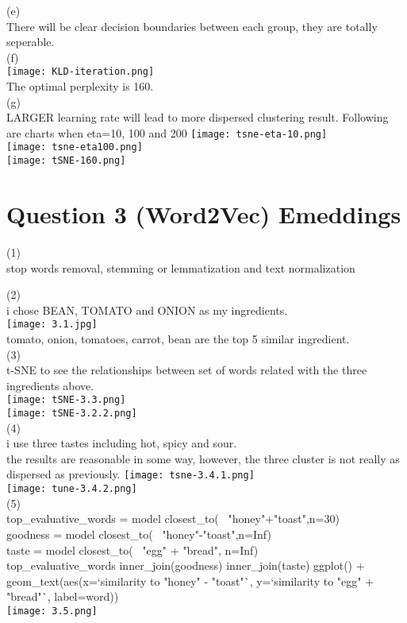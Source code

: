 \documentclass{article}
\begin{document}
(e) \\
There will be clear decision boundaries between each group, they are totally seperable. \\
(f) \\
\texttt{[image: KLD-iteration.png]}\\
The optimal perplexity is 160. \\
(g) \\
LARGER learning rate will lead to more dispersed clustering result.
Following are charts when eta=10, 100 and 200
\texttt{[image: tsne-eta-10.png]}\\
\texttt{[image: tsne-eta100.png]}\\
\texttt{[image: tSNE-160.png]}\\

\section{Question 3 (Word2Vec) Emeddings} 
(1) \\
stop words removal, stemming or lemmatization and text normalization 

(2) \\
i chose BEAN, TOMATO and ONION as my ingredients. \\
\texttt{[image: 3.1.jpg]}\\
tomato, onion, tomatoes, carrot, bean are the top 5 similar ingredient. \\
(3) \\
t-SNE to see the relationships between set of words related with the three ingredients above. \\
\texttt{[image: tSNE-3.3.png]}\\
\texttt{[image: tSNE-3.2.2.png]}\\

(4) \\
i use three tastes including hot, spicy and sour. \\
the results are reasonable in some way, however, the three cluster is not really as dispersed as previously. 
\texttt{[image: tsne-3.4.1.png]}\\
\texttt{[image: tune-3.4.2.png]}\\

(5) \\
top_evaluative_words = model %
  closest_to(~ "honey"+"toast",n=30) \\
goodness = model %
  closest_to(~ "honey"-"toast",n=Inf) \\
taste = model %
  closest_to(~ "egg" + "bread", n=Inf)\\
top_evaluative_words %
  inner_join(goodness) %
  inner_join(taste) %
  ggplot() + 
  geom_text(aes(x=`similarity to "honey" - "toast"`,
                y=`similarity to "egg" + "bread"`,
                label=word))\\
\texttt{[image: 3.5.png]}\\
\end{document}
